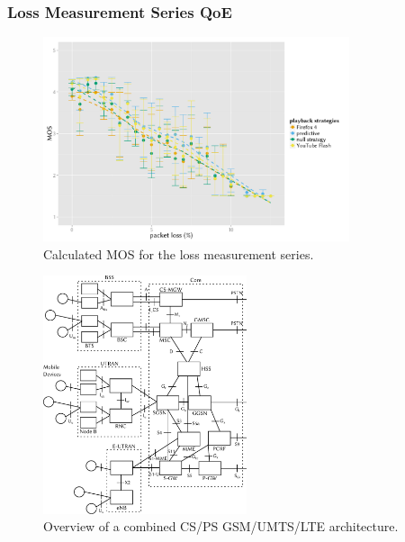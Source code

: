 \documentclass{beamer}
\begin{document}
\begin{frame}
	\frametitle{Loss Measurement Series QoE}

	\begin{figure}
		\centering
		\includegraphics[height=6cm]{../../chapters/03-streaming/images/R-playbackemulation-qoe-loss.pdf}
		\caption{Calculated MOS for the loss measurement series.}
	\end{figure}
\end{frame}







\begin{frame}
	\begin{figure}
		\centering
		\includegraphics[height=7cm]{../../chapters/04-mobilenets/images/3gpp-physical-arch.pdf}
		\caption{Overview of a combined CS/PS GSM/UMTS/LTE architecture.}
	\end{figure}
\end{frame}
\end{document}
